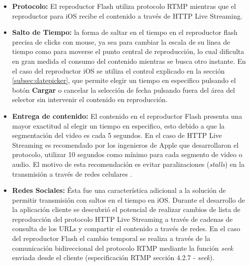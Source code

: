 \begin{itemize}
\item \textbf{Protocolo:} El reproductor Flash utiliza protocolo RTMP mientras que el reproductor para iOS recibe el contenido a través de HTTP Live Streaming.

\item \textbf{Salto de Tiempo:} la forma de saltar en el tiempo en el reproductor flash precisa de clicks con mouse, ya sea para cambiar la escala de su linea de tiempo como para moverse el punto central de reproducción, lo cual dificulta en gran medida el consumo del contenido mientras se busca otro instante. En el caso del reproductor iOS se utiliza el control explicado en la sección \ref{subsec:datepicker}, que permite elegir un tiempo en especifico pulsando el botón \textbf{Cargar} o cancelar la selección de fecha pulsando fuera del área del selector sin intervenir el contenido en reproducción.

\item \textbf{Entrega de contenido:} El contenido en el reproductor Flash presenta una mayor exactitud al elegir un tiempo en especifico, esto debido a que la segmentación del video es cada 5 segundos. En el caso de HTTP Live Streaming es recomendado por los ingenieros de Apple que desarrollaron el protocolo, utilizar 10 segundos como mínimo para cada segmento de video o audio. El motivo de esta recomendación es evitar paralizaciones (\textit{stalls}) en la transmisión a través de redes celulares \cite{bib:tensec-targetduration}.\\

\item \textbf{Redes Sociales:} Ésta fue una característica adicional a la solución de permitir transmisión con saltos en el tiempo en iOS. Durante el desarrollo de la aplicación cliente se descubrió el potencial de realizar cambios de lista de reproducción del protocolo HTTP Live Streaming a través de cadenas de consulta de los URLs y compartir el contenido a través de redes. En el caso del reproductor Flash el cambio temporal se realiza a través de la comunicación bidireccional del protocolo RTMP mediante la función \textit{seek} enviada desde el cliente (especificación RTMP \cite{bib:rtmp-specs} sección 4.2.7 - \textit{seek}).
\end{itemize}



